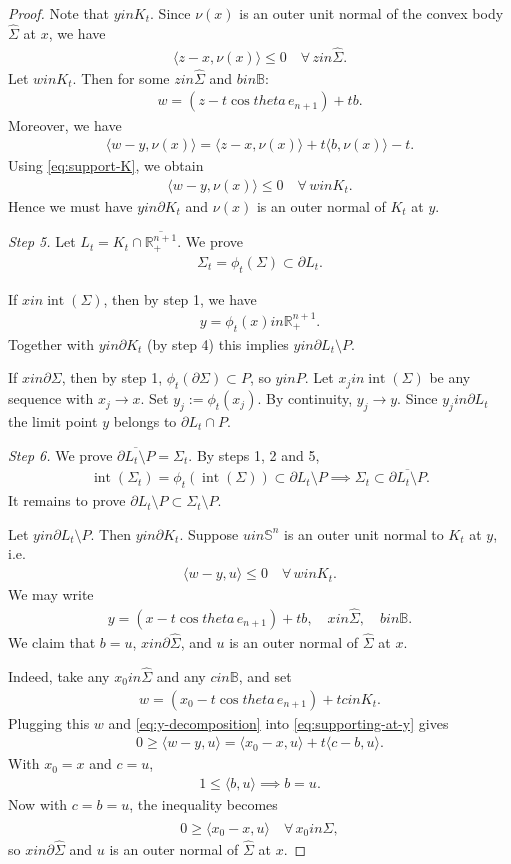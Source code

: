 \documentclass[10pt,a4paper]{amsart}
\newcommand{\Si}{\Sigma}
\newcommand{\bbB}{\mathbb{B}}
\newcommand{\bbR}{\mathbb{R}}
\newcommand{\bbS}{\mathbb{S}}
\newcommand{\eq}[1]{\begin{equation}\begin{alignedat}{2}#1\end{alignedat}\end{equation}}
\def\in{in }%
\newcommand{\ip}[2]{\langle #1,#2 \rangle}
\newcommand{\op}[1]{\operatorname{#1}}
\newcommand{\ov}{\overline}
\def\theta{theta}%
\newcommand{\wh}{\widehat}
\begin{document}
\begin{proof}
Note that $y\in K_t$. Since $\nu(x)$ is an outer unit normal of the convex body $\widehat{\Sigma}$ at $x$, we have
\eq{\label{eq:support-K}
  \ip{z-x}{\nu(x)}\le 0\quad\forall\,z\in \widehat{\Sigma}.
}
Let $w\in K_t$. Then for some $z\in \widehat{\Sigma}$ and $b\in\bbB$:
\eq{
  w=(z-t\cos\theta\,e_{n+1})+tb.
}
Moreover, we have
\eq{
  \ip{w-y}{\nu(x)} = \ip{z-x}{\nu(x)} + t\ip{b}{\nu(x)} - t.
}
Using \eqref{eq:support-K}, we obtain
\eq{
  \ip{w-y}{\nu(x)}\le 0\quad\forall\,w\in K_t.
}
Hence we must have $y\in\partial K_t$ and $\nu(x)$ is an outer normal of $K_t$ at $y$.

\emph{Step 5.} Let $L_t=K_t\cap\ov{\bbR^{n+1}_+}$.
We prove
\eq{
  \Sigma_t=\phi_t(\Sigma)\subset\partial L_t.
}

If  $x\in\op{int}(\Sigma)$, then by step 1, we have
\eq{
  y=\phi_t(x)\in\bbR^{n+1}_+.
}
Together with $y\in\partial K_t$ (by step 4) this implies $y\in\partial L_t\setminus P$.

If  $x\in\partial\Sigma$, then by step 1, $\phi_t(\partial\Sigma)\subset P$, so $y\in P$.
Let $x_j\in\op{int}(\Sigma)$ be any sequence with $x_j\to x$. Set $y_j:=\phi_t(x_j)$. By continuity, $y_j\to y$.
Since $y_j\in \partial L_t$ the limit point $y$ belongs to $\partial L_t\cap P$.

\emph{Step 6.}
We prove $ \ov{\partial L_t\setminus P}= \Sigma_t$. By steps 1, 2 and 5,
\eq{
  \op{int}(\Si_t)=\phi_t(\op{int}(\Si))\subset\partial L_t\setminus P\implies \Sigma_t \subset \ov{\partial L_t\setminus P}.
}
It remains to prove $\partial L_t\setminus P \subset \Sigma_t\setminus P$.


Let $y\in\partial L_t\setminus P$. Then $y\in\partial K_t$. Suppose $u\in\bbS^n$ is an outer unit normal to $K_t$ at $y$, i.e.
\eq{\label{eq:supporting-at-y}
  \ip{w-y}{u}\le 0\quad\forall\,w\in K_t.
}
We may write
\eq{\label{eq:y-decomposition}
  y=(x-t\cos\theta\,e_{n+1})+tb,
  \quad x\in \widehat{\Sigma},\quad b\in\bbB.
}
We claim that $b=u$, $x\in \partial \wh{\Si}$, and $u$ is an outer normal of $\widehat{\Sigma}$ at $x$. 

Indeed, take any $x_0\in \widehat{\Sigma}$ and any $c\in\bbB$, and set
\eq{
  w=(x_0-t\cos\theta\,e_{n+1})+tc\in K_t.
}
Plugging this $w$ and \eqref{eq:y-decomposition} into \eqref{eq:supporting-at-y} gives
\eq{
  0\ge \ip{w-y}{u}
  =\ip{x_0-x}{u}+t\ip{c-b}{u}.
}
With $x_0=x$ and $c=u$,
\eq{
  1\le \ip{b}{u}\implies b=u.
}
Now with $c=b=u$, the inequality becomes
\eq{
  0\ge \ip{x_0-x}{u}\quad\forall\,x_0\in \widehat{\Sigma},
}
so $x\in \partial \wh{\Si}$ and $u$ is an outer normal of $\widehat{\Sigma}$ at $x$.


\end{proof}
\end{document}
